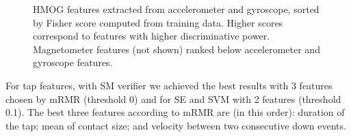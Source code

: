 \begin{figure}[tb] 


\caption[]{HMOG features extracted from accelerometer and gyroscope, sorted by Fisher score computed from training data. Higher scores correspond to features with higher discriminative power. 
%
Magnetometer features (not shown) ranked below accelerometer and gyroscope features.
}
 \label{fig:fisherFeatures}
\end{figure}

For tap features, with SM verifier we achieved the best results  with 3 features chosen by mRMR (threshold 0) and for SE and SVM with 2 features (threshold 0.1). The best three features according to mRMR are (in this order): duration of the tap; mean of contact size; and velocity between two consecutive down events. 

